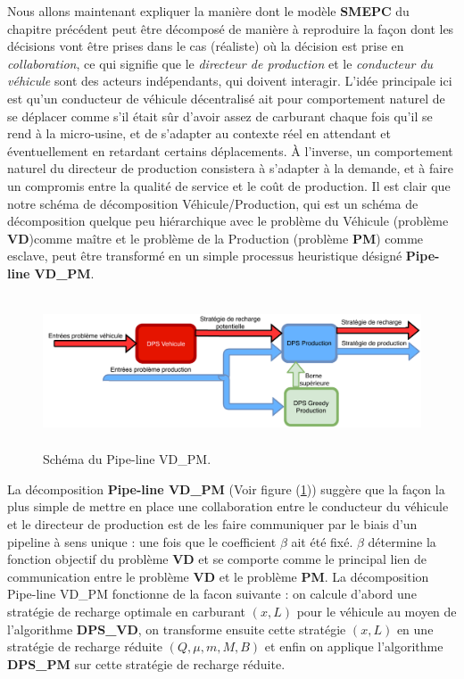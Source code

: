 Nous allons maintenant expliquer la manière dont le modèle \textbf{SMEPC} du chapitre précédent peut être décomposé de manière à reproduire la façon dont les décisions vont être prises dans le cas (réaliste) où la décision est prise en \textit{collaboration}, ce qui signifie que le \textit{directeur de production} et le \textit{conducteur du véhicule} sont des acteurs indépendants, qui doivent interagir. L'idée principale ici est qu'un conducteur de véhicule décentralisé ait pour comportement naturel de se déplacer comme s'il était sûr d'avoir assez de carburant chaque fois qu'il se rend à la micro-usine, et de s'adapter au contexte réel en attendant et éventuellement en retardant certains déplacements. À l'inverse, un comportement naturel du directeur de production consistera à s'adapter à la demande, et à faire un compromis entre la qualité de service et le coût de production. Il est clair que notre schéma de décomposition Véhicule/Production, qui est un schéma de décomposition quelque peu hiérarchique avec le problème du Véhicule (problème \textbf{VD})comme maître et le problème de la Production (problème \textbf{PM}) comme esclave, peut être transformé en un simple processus heuristique désigné \textbf{Pipe-line VD\_PM}.

\begin{figure}[H]
	\centerline{
		\includegraphics[height=4.5cm]{images_these/Pipeline.pdf}}
	\caption[Schéma du Pipe-line VD\_PM]{Schéma du Pipe-line VD\_PM.}
	\label{Pipeline}
\end{figure}

La décomposition \textbf{Pipe-line VD\_PM} (Voir figure (\ref{Pipeline})) suggère que la façon la plus simple de mettre en place une collaboration entre le conducteur du véhicule et le directeur de production est de les faire communiquer par le biais d'un pipeline à sens unique : une fois que le coefficient $\beta$  ait été fixé. $\beta$ détermine la fonction objectif du problème \textbf{VD} et se comporte comme le principal lien de communication entre le problème \textbf{VD} et le problème \textbf{PM}. La décomposition Pipe-line VD\_PM fonctionne de la facon suivante : on calcule d'abord une stratégie de recharge optimale en carburant $(x, L)$ pour le véhicule au moyen de l'algorithme \textbf{DPS\_VD}, on transforme ensuite cette stratégie $(x, L)$ en une stratégie de recharge réduite $(Q, \mu, m, M, B)$ et enfin on applique l'algorithme \textbf{DPS\_PM} sur cette stratégie de recharge réduite.  

